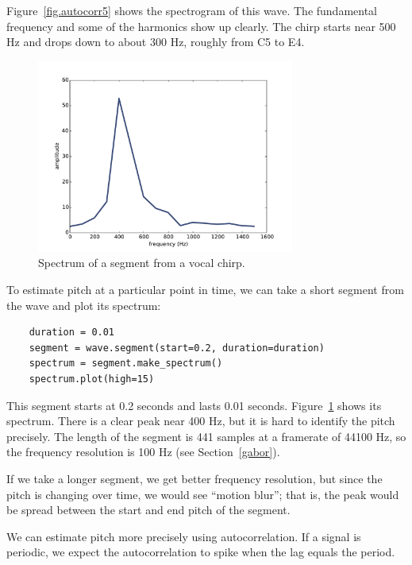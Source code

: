 \documentclass[12pt]{book}
\begin{document}
Figure~\ref{fig.autocorr5} shows the spectrogram of this wave.
The fundamental frequency and some of the harmonics show up clearly.
The chirp starts near 500 Hz and drops down to about 300 Hz, roughly
from C5 to E4.

\begin{figure}
\centerline{\includegraphics[height=2.5in]{figs/autocorr6.pdf}}
\caption{Spectrum of a segment from a vocal chirp.}
\label{fig.autocorr6}
\end{figure}

To estimate pitch at a particular point in time, we can take
a short segment from the wave and plot its spectrum:

\begin{verbatim}
    duration = 0.01
    segment = wave.segment(start=0.2, duration=duration)
    spectrum = segment.make_spectrum()
    spectrum.plot(high=15)
\end{verbatim}

This segment starts at 0.2 seconds and lasts 0.01 seconds.
Figure~\ref{fig.autocorr6} shows its spectrum.  There is a clear peak near
400 Hz, but it is hard to identify the pitch precisely.  The length of
the segment is 441 samples at a framerate of 44100 Hz, so the
frequency resolution is 100 Hz (see Section~\ref{gabor}).

If we take a longer segment, we get better frequency resolution, but
since the pitch is changing over time, we would see ``motion blur'';
that is, the peak would be spread between the start and end pitch
of the segment.

We can estimate pitch more precisely using autocorrelation.
If a signal is periodic, we expect the autocorrelation to spike
when the lag equals the period.
\end{document}
